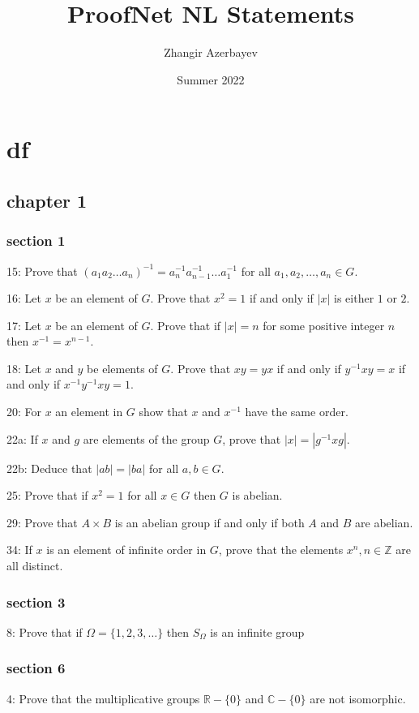 \documentclass{article}
\title{ProofNet NL Statements}
\author{Zhangir Azerbayev}
\date{Summer 2022}
\begin{document}
\maketitle
\section*{df}
\subsection*{chapter 1}
\subsubsection*{section 1}
15: Prove that $(a_1a_2\dots a_n)^{-1} = a_n^{-1}a_{n-1}^{-1}\dots a_1^{-1}$ for all $a_1, a_2, \dots, a_n\in G$. 

16: Let $x$ be an element of $G$. Prove that $x^2=1$ if and only if $|x|$ is either $1$ or $2$. 

17: Let $x$ be an element of $G$. Prove that if $|x|=n$ for some positive integer $n$ then $x^{-1}=x^{n-1}$. 

18: Let $x$ and $y$ be elements of $G$. Prove that $xy=yx$ if and only if $y^{-1}xy=x$ if and only if $x^{-1}y^{-1}xy=1$.

20: For $x$ an element in $G$ show that $x$ and $x^{-1}$ have the same order.

22a: If $x$ and $g$ are elements of the group $G$, prove that $|x|=\left|g^{-1} x g\right|$. 

22b: Deduce that $|a b|=|b a|$ for all $a, b \in G$.

25: Prove that if $x^{2}=1$ for all $x \in G$ then $G$ is abelian.

29: Prove that $A \times B$ is an abelian group if and only if both $A$ and $B$ are abelian.

34: If $x$ is an element of infinite order in $G$, prove that the elements $x^{n}, n \in \mathbb{Z}$ are all distinct.

\subsubsection*{section 3}
8: Prove that if $\Omega=\{1,2,3, \ldots\}$ then $S_{\Omega}$ is an infinite group

\subsubsection*{section 6}
4: Prove that the multiplicative groups $\mathbb{R}-\{0\}$ and $\mathbb{C}-\{0\}$ are not isomorphic.
\end{document}
